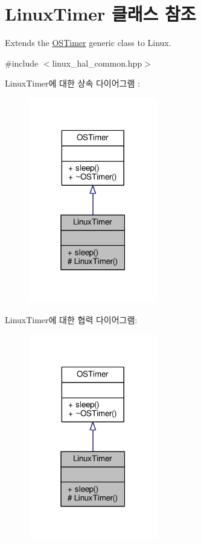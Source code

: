 \hypertarget{class_linux_timer}{}\section{Linux\+Timer 클래스 참조}
\label{class_linux_timer}


Extends the \hyperlink{class_o_s_timer}{O\+S\+Timer} generic class to Linux.  




{\ttfamily \#include $<$linux\+\_\+hal\+\_\+common.\+hpp$>$}



Linux\+Timer에 대한 상속 다이어그램 \+: 
\nopagebreak
\begin{figure}[H]
\begin{center}
\leavevmode
\includegraphics[width=159pt]{class_linux_timer__inherit__graph}
\end{center}
\end{figure}


Linux\+Timer에 대한 협력 다이어그램\+:
\nopagebreak
\begin{figure}[H]
\begin{center}
\leavevmode
\includegraphics[width=159pt]{class_linux_timer__coll__graph}
\end{center}
\end{figure}
